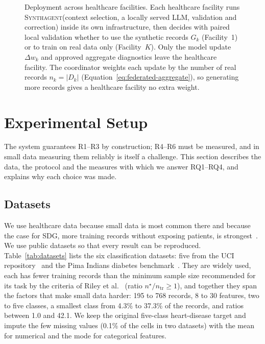 \documentclass[conference]{IEEEtran}
\newcommand{\system}{\textsc{Synthagent}\xspace}
\begin{document}
\begin{figure}[t]
\centering
\begin{minipage}[c]{0.6\textwidth}
\resizebox{\linewidth}{!}{}
\end{minipage}\hfill
\begin{minipage}[c]{0.37\textwidth}
\caption{Deployment across healthcare facilities. Each healthcare facility runs \system (context selection, a locally served LLM, validation and correction) inside its own infrastructure, then decides with paired local validation whether to use the synthetic records $G_k$ (Facility~1) or to train on real data only (Facility~$K$). Only the model update $\Delta w_k$ and approved aggregate diagnostics leave the healthcare facility. The coordinator weights each update by the number of real records $n_k=|D_k|$ (Equation~\eqref{eq:federated-aggregate}), so generating more records gives a healthcare facility no extra weight.}
\label{fig:federated}
\end{minipage}
\end{figure}

\section{Experimental Setup}
\label{sec:setup}
The system guarantees R1--R3 by construction; R4--R6 must be measured, and in small data measuring them reliably is itself a challenge. This section describes the data, the protocol and the measures with which we answer RQ1--RQ4, and explains why each choice was made.

\subsection{Datasets}
We use healthcare data because small data is most common there and because the case for SDG, more training records without exposing patients, is strongest~\cite{rieke2020digitalhealth}. We use public datasets so that every result can be reproduced. Table~\ref{tab:datasets} lists the six classification datasets: five from the UCI repository~\cite{uciheart,ucibreast,uciheartfailure,uciilpd,uciparkinsons} and the Pima Indians diabetes benchmark~\cite{smith1988diabetes}. They are widely used, each has fewer training records than the minimum sample size recommended for its task by the criteria of Riley et al.~\cite{riley2019binary} (ratio $n^{\star}/n_{\mathrm{tr}}\ge1$), and together they span the factors that make small data harder: 195 to 768 records, 8 to 30 features, two to five classes, a smallest class from 4.3\% to 37.3\% of the records, and ratios between 1.0 and 42.1. We keep the original five-class heart-disease target and impute the few missing values (0.1\% of the cells in two datasets) with the mean for numerical and the mode for categorical features.
\end{document}
